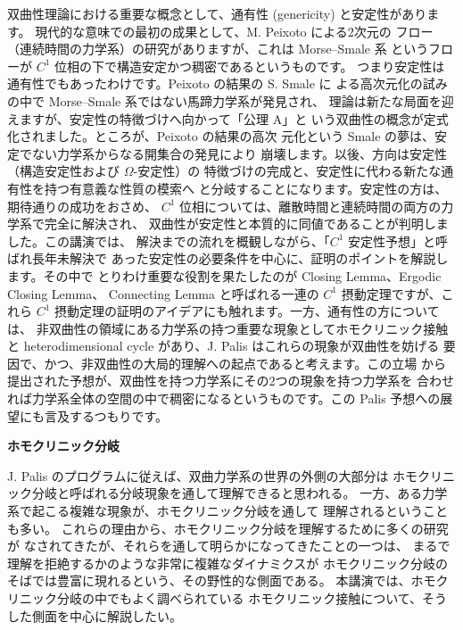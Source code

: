 \documentclass[uplatex,dvipdfmx]{jlreq}
\begin{document}
双曲性理論における重要な概念として、通有性 (genericity) と安定性があります。
現代的な意味での最初の成果として、M. Peixoto による2次元の
フロー（連続時間の力学系）の研究がありますが、これは Morse--Smale 系
というフローが $C^1$ 位相の下で構造安定かつ稠密であるというものです。
つまり安定性は通有性でもあったわけです。Peixoto の結果の S. Smale に
よる高次元化の試みの中で Morse--Smale 系ではない馬蹄力学系が発見され、
理論は新たな局面を迎えますが、安定性の特徴づけへ向かって「公理 A」と
いう双曲性の概念が定式化されました。ところが、Peixoto の結果の高次
元化という Smale の夢は、安定でない力学系からなる開集合の発見により
崩壊します。以後、方向は安定性（構造安定性および $\Omega$-安定性）の
特徴づけの完成と、安定性に代わる新たな通有性を持つ有意義な性質の模索へ
と分岐することになります。安定性の方は、期待通りの成功をおさめ、
$C^1$ 位相については、離散時間と連続時間の両方の力学系で完全に解決され、
双曲性が安定性と本質的に同値であることが判明しました。この講演では、
解決までの流れを概観しながら、「$C^1$ 安定性予想」と呼ばれ長年未解決で
あった安定性の必要条件を中心に、証明のポイントを解説します。その中で
とりわけ重要な役割を果たしたのが Closing Lemma、Ergodic Closing Lemma、
Connecting Lemma と呼ばれる一連の $C^1$ 摂動定理ですが、これら $C^1$
摂動定理の証明のアイデアにも触れます。一方、通有性の方については、
非双曲性の領域にある力学系の持つ重要な現象としてホモクリニック接触と
heterodimensional cycle があり、J. Palis はこれらの現象が双曲性を妨げる
要因で、かつ、非双曲性の大局的理解への起点であると考えます。この立場
から提出された予想が、双曲性を持つ力学系にその2つの現象を持つ力学系を
合わせれば力学系全体の空間の中で稠密になるというものです。この Palis
予想への展望にも言及するつもりです。

\newpage

\begin{center}
{\large\bfseries ホモクリニック分岐}\\[6pt]
\hspace*{\fill}{\large\bfseries 浅岡 正幸（京都大学 大学院理学研究科 数学教室）}
\end{center}
\vspace{1pc}

J. Palis のプログラムに従えば、双曲力学系の世界の外側の大部分は
ホモクリニック分岐と呼ばれる分岐現象を通して理解できると思われる。
一方、ある力学系で起こる複雑な現象が、ホモクリニック分岐を通して
理解されるということも多い。
これらの理由から、ホモクリニック分岐を理解するために多くの研究が
なされてきたが、それらを通して明らかになってきたことの一つは、
まるで理解を拒絶するかのような非常に複雑なダイナミクスが
ホモクリニック分岐のそばでは豊富に現れるという、その野性的な側面である。
本講演では、ホモクリニック分岐の中でもよく調べられている
ホモクリニック接触について、そうした側面を中心に解説したい。
\end{document}
